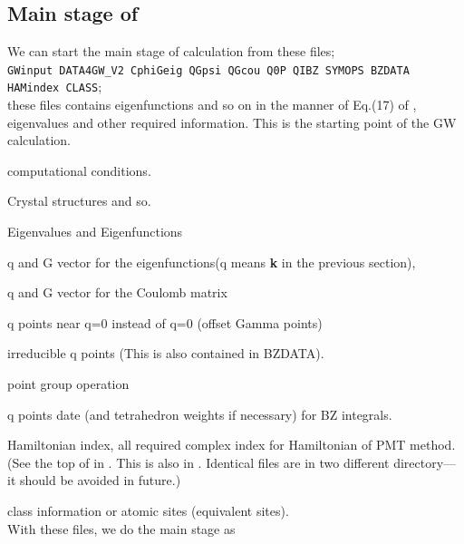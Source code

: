 \subsection{\bf Main stage of }
\label{mainstage}
We can start the main stage of \GW calculation from these files;\\
\verb#GWinput DATA4GW_V2 CphiGeig QGpsi QGcou Q0P QIBZ SYMOPS BZDATA HAMindex CLASS#;\\
\noindent these files contains eigenfunctions and so on in the manner 
of Eq.(17) of \cite{kotani_quasiparticle_2014}, eigenvalues and other required
information. This is the starting point of the GW calculation.\\

{\baselineskip=5mm

 computational conditions.

 Crystal structures and so.

 Eigenvalues and Eigenfunctions

 q and G vector for the eigenfunctions(q means {\bf k} in the previous section),

 q and G vector for the Coulomb matrix

   q points near q=0 instead of q=0 (offset Gamma points)

  irreducible q points (This is also contained in {\sf BZDATA}).

 point group operation

 q points date (and tetrahedron weights if necessary) for BZ integrals.

 Hamiltonian index, all required complex index for Hamiltonian of PMT method.
(See the top of  in . 
This is also in . Identical files are in two
different directory--- it should be avoided in future.)

 class information or atomic sites (equivalent sites).\\


With these files, we do the main stage as

}
